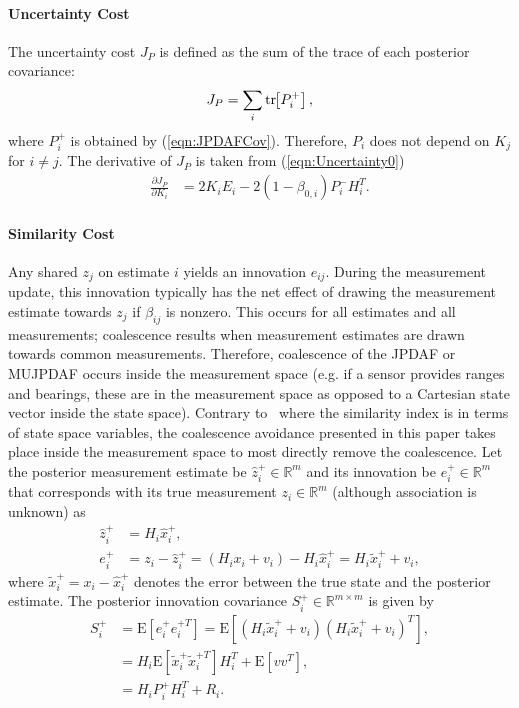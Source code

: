 \documentclass[letterpaper, 10pt, conference]{ieeeconf}
\newcommand{\bracket}[1]{\ensuremath{\left[ #1 \right]}}
\newcommand{\refeqn}[1]{(\ref{eqn:#1})}
\newcommand{\tr}[1]{\mathrm{tr}\ensuremath{\negthickspace\bracket{#1}}}
\renewcommand{\Re}{\ensuremath{\mathbb{R}}}
\begin{document}
\paragraph*{Uncertainty Cost}
The uncertainty cost $J_P$ is defined as the sum of the trace of each posterior covariance:
\begin{align}
J_P=\sum\limits_{i}\tr{P^+_i},\label{eqn:JP}
\end{align}
where $P^+_{i}$ is obtained by \refeqn{JPDAFCov}.
Therefore, $P_i$ does not depend on $K_j$ for $i\neq j$.
The derivative of $J_P$ is taken from \refeqn{Uncertainty0}
\begin{align}
\label{eqn:CostP}
\frac{\partial J_{P}}{\partial K_{i}}&=2K_iE_i-2(1-\beta_{0,i})P^-_iH_i^T.
\end{align}

\paragraph*{Similarity Cost}
Any shared $z_j$ on estimate $i$ yields an innovation $e_{ij}$.
During the measurement update, this innovation typically has the net effect of drawing the measurement estimate towards $z_j$ if $\beta_{ij}$ is nonzero.
This occurs for all estimates and all measurements; coalescence results when measurement estimates are drawn towards common measurements.
Therefore, coalescence of the JPDAF or MUJPDAF occurs inside the measurement space (e.g. if a sensor provides ranges and bearings, these are in the measurement space as opposed to a Cartesian state vector inside the state space).
Contrary to~\cite{KauLovLee14} where the similarity index is in terms of state space variables, the coalescence avoidance presented in this paper takes place inside the measurement space to most directly remove the coalescence.
Let the posterior measurement estimate be $\hat z_i^+\in\Re^m$ and its innovation be $e_{i}^+\in\Re^m$ that corresponds with its true measurement $z_i\in\Re^m$ (although association is unknown) as
\begin{align}
\hat z_i^+&=H_i\hat x_i^+,
\\
e_{i}^+&=z_i-\hat z_i^+=(H_ix_i+v_i)-H_i\hat x_{i}^+=H_i\tilde x_i^++v_i,
\end{align}
where $\tilde x_i^+=x_i-\hat x_{i}^+$ denotes the error between the true state and the posterior estimate. The posterior innovation covariance $S^+_i\in\Re^{m\times m}$ is given by
\begin{align}
S^+_i&=\mathrm{E}[e_i^+e_i^{+T}]=\mathrm{E}[(H_i\tilde x_i^++v_i)(H_i\tilde x_i^++v_i)^T],\nonumber
\\
&=H_i\mathrm{E}[\tilde x_i^+\tilde x_i^{+T}]H_i^T+\mathrm{E}[vv^T],\nonumber
\\
&=H_iP^+_iH_i^T+R_i.
\end{align}
\end{document}
